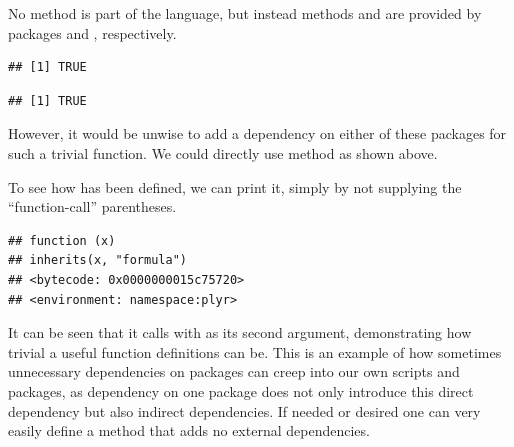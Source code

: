 \documentclass[krantz2]{krantz}\usepackage{knitr}%
\begin{document}
\begin{warningbox}
No method  is part of the \Rlang language, but instead methods  and  are provided by packages  and , respectively.

\begin{knitrout}\footnotesize
{}\color{fgcolor}\begin{kframe}
\begin{alltt}
\hlopt{::}
\end{alltt}
\begin{verbatim}
## [1] TRUE
\end{verbatim}
\begin{alltt}
\hlopt{::}
\end{alltt}
\begin{verbatim}
## [1] TRUE
\end{verbatim}
\end{kframe}
\end{knitrout}

However, it would be unwise to add a dependency on either of these packages for such a trivial function. We could directly use \Rlang method  as shown above.

To see how  has been defined, we can print it, simply by not supplying the ``function-call'' parentheses.

\begin{knitrout}\footnotesize
{}\color{fgcolor}\begin{kframe}
\begin{alltt}
\hlopt{::}
\end{alltt}
\begin{verbatim}
## function (x) 
## inherits(x, "formula")
## <bytecode: 0x0000000015c75720>
## <environment: namespace:plyr>
\end{verbatim}
\end{kframe}
\end{knitrout}

It can be seen that it calls  with  as its second argument, demonstrating how trivial a useful function definitions can be. This is an example of how sometimes unnecessary dependencies on packages can creep into our own scripts and packages, as dependency on one package does not only introduce this direct dependency but also indirect dependencies. If needed or desired one can very easily define a  method that adds no external dependencies.
\end{warningbox}
\end{document}
